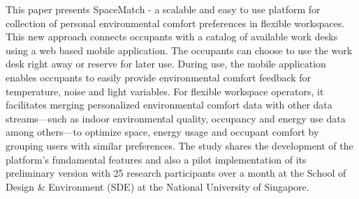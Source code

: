 \documentclass[]{interact}
\theoremstyle{plain}%
\theoremstyle{definition}
\theoremstyle{remark}
\begin{document}
This paper presents SpaceMatch - a scalable and easy to use platform for collection of personal environmental comfort preferences in flexible workspaces. This new approach connects occupants with a catalog of available work desks using a web based mobile application. The occupants can choose to use the work desk right away or reserve for later use. During use, the mobile application enables occupants to easily provide environmental comfort feedback for temperature, noise and light variables. 
For flexible workspace operators, it facilitates merging personalized environmental comfort data with other data streams---such as indoor environmental quality, occupancy and energy use data among others---to optimize space, energy usage and occupant comfort by grouping users with similar preferences. The study shares the development of the platform's fundamental features and also a pilot implementation of its preliminary version with 25 research participants over a month at the School of Design & Environment (SDE) at the National University of Singapore. 


\end{document}
